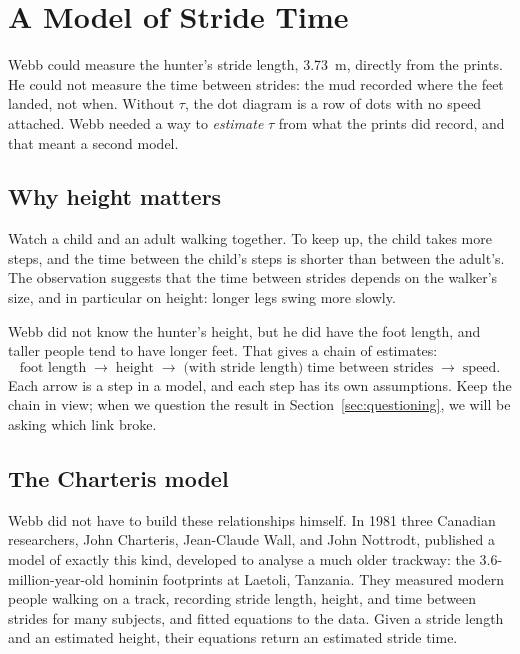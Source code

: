 
\section{A Model of Stride Time}
\label{sec:stridemodel}

Webb could measure the hunter's stride length, \SI{3.73}{\metre}, directly from the prints. He could not measure the time between strides: the mud recorded where the feet landed, not when. Without $\tau$, the dot diagram is a row of dots with no speed attached. Webb needed a way to \emph{estimate} $\tau$ from what the prints did record, and that meant a second model.

\subsection{Why height matters}

Watch a child and an adult walking together. To keep up, the child takes more steps, and the time between the child's steps is shorter than between the adult's. The observation suggests that the time between strides depends on the walker's size, and in particular on height: longer legs swing more slowly.

Webb did not know the hunter's height, but he did have the foot length, and taller people tend to have longer feet. That gives a chain of estimates:
\[
\text{foot length} \;\longrightarrow\; \text{height} \;\longrightarrow\; \text{(with stride length)}\;\text{time between strides} \;\longrightarrow\; \text{speed}.
\]
Each arrow is a step in a model, and each step has its own assumptions. Keep the chain in view; when we question the result in Section~\ref{sec:questioning}, we will be asking which link broke.

\subsection{The Charteris model}

Webb did not have to build these relationships himself. In 1981 three Canadian researchers, John Charteris, Jean-Claude Wall, and John Nottrodt, published a model of exactly this kind, developed to analyse a much older trackway: the \num{3.6}-million-year-old hominin footprints at Laetoli, Tanzania. They measured modern people walking on a track, recording stride length, height, and time between strides for many subjects, and fitted equations to the data. Given a stride length and an estimated height, their equations return an estimated stride time.

